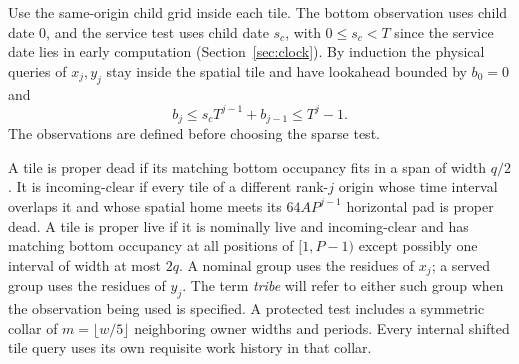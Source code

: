 Use the same-origin child grid inside each tile. The bottom observation uses child date \(0\), and the service test uses child date \(s_c\), with \(0\le s_c<T\) since the service date lies in early computation (Section~\ref{sec:clock}). By induction the physical queries of \(x_j,y_j\) stay inside the spatial tile and have lookahead bounded by \(b_0=0\) and
\[
b_j\le s_cT^{j-1}+b_{j-1}\le T^j-1 .
\]
The observations are defined before choosing the sparse test.

\begin{definition}\label{def:proper}
A tile is proper dead if its matching bottom occupancy fits in a span of width \(q/2\). It is incoming-clear if every tile of a different rank-\(j\) origin whose time interval overlaps it and whose spatial home meets its \(64A P^{j-1}\) horizontal pad is proper dead. A tile is proper live if it is nominally live and incoming-clear and has matching bottom occupancy at all positions of \([1,P-1)\) except possibly one interval of width at most \(2q\). A nominal group uses the residues of \(x_j\); a served group uses the residues of \(y_j\). The term \emph{tribe} will refer to either such group when the observation being used is specified. A protected test includes a symmetric collar of \(m=\lfloor w/5\rfloor\) neighboring owner widths and periods. Every internal shifted tile query uses its own requisite work history in that collar.
\end{definition}

